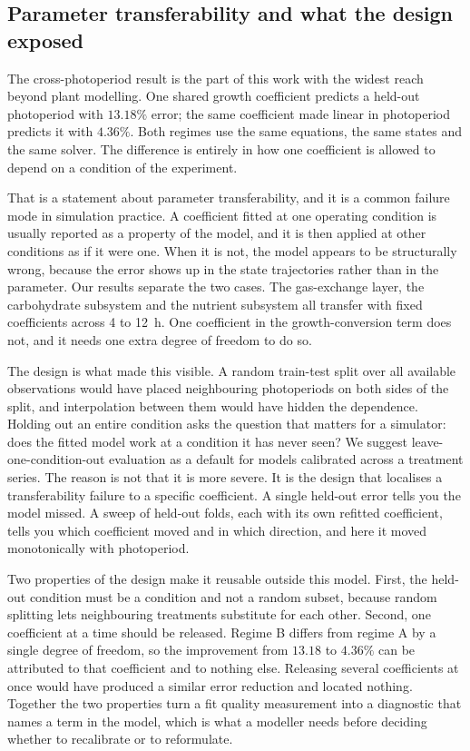 \subsection{Parameter transferability and what the design exposed}

The cross-photoperiod result is the part of this work with the widest reach
beyond plant modelling. One shared growth coefficient predicts a held-out
photoperiod with $13.18\%$ error; the same coefficient made linear in
photoperiod predicts it with $4.36\%$. Both regimes use the same equations, the
same states and the same solver. The difference is entirely in how one
coefficient is allowed to depend on a condition of the experiment.

That is a statement about parameter transferability, and it is a common failure
mode in simulation practice. A coefficient fitted at one operating condition is
usually reported as a property of the model, and it is then applied at other
conditions as if it were one. When it is not, the model appears to be
structurally wrong, because the error shows up in the state trajectories rather
than in the parameter. Our results separate the two cases. The gas-exchange
layer, the carbohydrate subsystem and the nutrient subsystem all transfer with
fixed coefficients across 4 to 12~h. One coefficient in the growth-conversion
term does not, and it needs one extra degree of freedom to do so.

The design is what made this visible. A random train-test split over all
available observations would have placed neighbouring photoperiods on both
sides of the split, and interpolation between them would have hidden the
dependence. Holding out an entire condition asks the question that matters for
a simulator: does the fitted model work at a condition it has never seen? We
suggest leave-one-condition-out evaluation as a default for models calibrated
across a treatment series. The reason is not that it is more severe. It is the
design that localises a transferability failure to a specific coefficient. A
single held-out error tells you the model missed. A
sweep of held-out folds, each with its own refitted coefficient, tells you
which coefficient moved and in which direction, and here it moved monotonically
with photoperiod.

Two properties of the design make it reusable outside this model. First, the
held-out condition must be a condition and not a random subset, because random
splitting lets neighbouring treatments substitute for each other. Second, one
coefficient at a time should be released. Regime B differs from regime A by a
single degree of freedom, so the improvement from $13.18$ to $4.36\%$ can be
attributed to that coefficient and to nothing else. Releasing several
coefficients at once would have produced a similar error reduction and located
nothing. Together the two properties turn a fit quality measurement into a
diagnostic that names a term in the model, which is what a modeller needs before
deciding whether to recalibrate or to reformulate.

